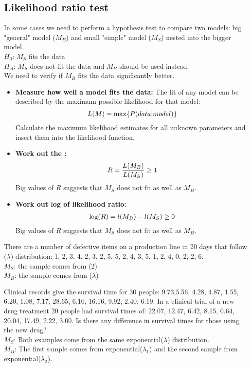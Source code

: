 \subsection{Likelihood ratio test}

In some cases we need to perform a hypothesis test to compare two models: big "general" model ($M_B$) and small "simple" model ($M_S$) nested into the bigger model. \\
$H_0$: $M_S$ fits the data \\
$H_A$: $M_S$ does not fit the data and $M_B$ should be used instead. \\

We need to verify if $M_B$ fits the data significantly better.
\begin{itemize}
	\item \textbf{Measure how well a model fits the data:} The fit of any model can be described by the maximum possible likelihood for that model:
	\begin{align}
		L(M) = \max\{P(data\vert model)\}\notag
	\end{align}
	Calculate the maximum likelihood estimates for all unknown parameters and insert them into the likelihood function.
	\item \textbf{Work out the :} 
	\begin{align}
		R = \frac{L(M_B)}{L(M_S)} \ge 1\notag
	\end{align}
	Big values of $R$ suggests that $M_S$ does not fit as well as $M_B$.
	\item \textbf{Work out log of likelihood ratio:} 
	\begin{align}
		\log(R) = l(M_B) - l(M_S) \ge 0\notag
	\end{align}
	Big values of $R$ suggests that $M_S$ does not fit as well as $M_B$.
\end{itemize}

\begin{example}
	There are a number of defective items on  a production line in 20 days that follow ($\lambda$) distribution: 1, 2, 3, 4, 2, 3, 2, 5, 5, 2, 4, 3, 5, 1, 2, 4, 0, 2, 2, 6. \\
	$M_S$: the sample comes from (2) \\
	$M_B$: the sample comes from ($\lambda$) \\
\end{example}

\begin{example}
	Clinical records give the survival time for 30 people: 9.73,5.56, 4.28, 4.87, 1.55, 6.20, 1.08, 7.17, 28.65, 6.10, 16.16, 9.92, 2.40, 6.19. In a clinical trial of a new drug treatment 20 people had survival times of: 22.07, 12.47, 6.42, 8.15, 0.64, 20.04, 17.49, 2.22, 3.00. Is there any difference in survival times for those using the new drug? \\
	$M_S$: Both examples come from the same exponential($\lambda$) distribution. \\
	$M_B$: The first sample comes from exponential($\lambda_1$) and the second sample from exponential($\lambda_2$).
\end{example}

